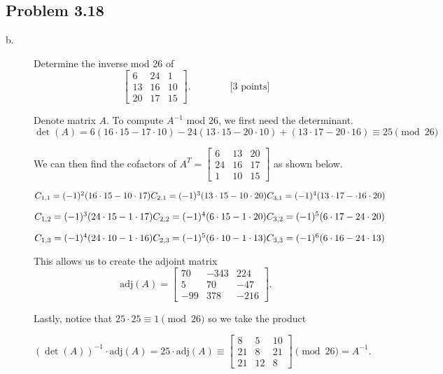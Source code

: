 \documentclass[../hw_sols.tex]{subfiles}
\begin{document}
\subsection*{Problem 3.18}
\begin{description}

\item[b.] Determine the inverse mod 26 of
	$$\begin{bmatrix}
		6  & 24 &  1 \\ 
		13 & 16 & 10 \\ 
		20 & 17 & 15
	\end{bmatrix}
	. \qquad\qquad \text{[3 points]}$$

\begin{solution}
Denote matrix $A$. To compute $A^{-1}$ mod 26, we first need the determinant.
	$$\det(A) = 
	6(16 \cdot 15 - 17 \cdot 10) - 24(13 \cdot 15 - 20 \cdot 10) + (13 \cdot 17 - 20 \cdot 16) \equiv 25 \pmod{26}$$

We can then find the cofactors of 
	$A^T = 
	\begin{bmatrix}
		 6 & 13 & 20 \\ 
		24 & 16 & 17 \\ 
		 1 & 10 & 15
	\end{bmatrix}$
as shown below.
	
\begin{multicols}{3}
	$C_{1,1} = (-1)^2(16 \cdot 15 - 10 \cdot 17) \\
	C_{2,1} = (-1)^3(13 \cdot 15 - 10 \cdot 20)  \\
	C_{3,1} = (-1)^4(13 \cdot 17 - \cdot 16 \cdot 20)$
	
	$C_{1,2} = (-1)^3(24 \cdot 15 - 1 \cdot 17) \\
	C_{2,2} = (-1)^4(6 \cdot 15 - 1 \cdot 20)   \\
	C_{3,2} = (-1)^5(6 \cdot 17 - 24 \cdot 20)$
	
	$C_{1,3} = (-1)^4(24 \cdot 10 - 1 \cdot 16) \\
	C_{2,3} = (-1)^5(6 \cdot 10 - 1 \cdot 13)   \\
	C_{3,3} = (-1)^6(6 \cdot 16 - 24 \cdot 13)$
\end{multicols}

This allows us to create the adjoint matrix
	$$\text{adj}(A) =
	\begin{bmatrix}
		 70 & -343 &  224 \\ 
		  5 &   70 &  -47 \\ 
		-99 &  378 & -216
	\end{bmatrix}.$$

Lastly, notice that $25 \cdot 25 \equiv 1 \pmod{26}$ so we take the product

	$$(\det(A))^{-1} \cdot \text{adj}(A) 
	= 25 \cdot \text{adj}(A) 
	\equiv 
	\begin{bmatrix}
		 8 &  5 & 10 \\ 
		21 &  8 & 21 \\ 
		21 & 12 & 8
	\end{bmatrix} 
	\pmod{26} = A^{-1}.$$

\end{solution}

\end{description}
\end{document}
